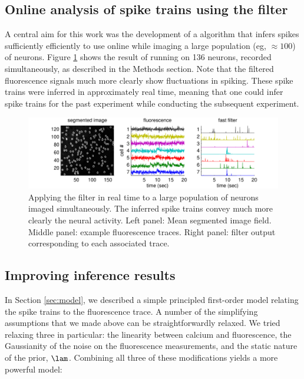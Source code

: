 \subsection{Online analysis of spike trains using the \foopsi filter}

A central aim for this work was the development of a algorithm that infers spikes sufficiently efficiently to use online while imaging a large population (eg, $\approx 100$) of neurons.  Figure \ref{fig:pop} shows the result of running \foopsi on 136 neurons, recorded simultaneously, as described in the Methods section.  Note that the filtered fluorescence signals much more clearly show fluctuations in spiking. These spike trains were inferred in approximately real time, meaning that one could infer spike trains for the past experiment while conducting the subsequent experiment.


\begin{figure}[h!]
\centering \includegraphics[width=.9\linewidth]{../figs/pop}
\caption{Applying the \foopsi filter in real time to a large population of neurons imaged simultaneously.  The inferred spike trains convey much more clearly the neural activity.  Left panel: Mean segmented image field.  Middle panel: example fluorescence traces.  Right panel: \foopsi filter output corresponding to each associated trace.} \label{fig:pop}
\end{figure}


\subsection{Improving inference results}

In Section \ref{sec:model}, we described a simple principled first-order model relating the spike trains to the fluorescence trace.  A number of the simplifying assumptions that we made above can be straightforwardly relaxed.  We tried relaxing three in particular: the linearity between calcium and fluorescence, the Gaussianity of the noise on the fluorescence measurements, and the static nature of the prior, $\lam$.  Combining all three of these modifications yields a more powerful model:


